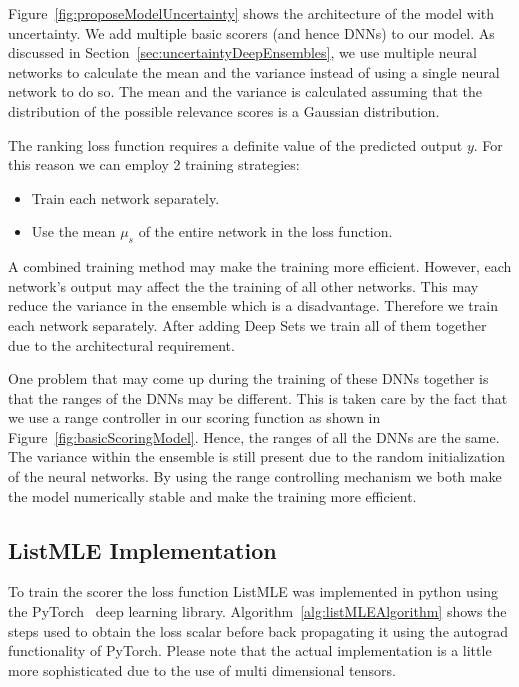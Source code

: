 \documentclass[12pt, twoside, ngerman]{report}
\begin{document}
Figure~\ref{fig:proposeModelUncertainty} shows the architecture of the model with uncertainty.
We add multiple basic scorers (and hence DNNs) to our model.
As discussed in Section~\ref{sec:uncertaintyDeepEnsembles},  we use multiple neural networks to calculate the mean and the variance instead of using a single neural network to do so.
The mean and the variance is calculated assuming that the distribution of the possible relevance scores is a Gaussian distribution.

The ranking loss function requires a definite value of the predicted output $y$.
For this reason we can employ 2 training strategies:
\begin{itemize}
\item Train each network separately.
\item Use the mean $\mu_s$ of the entire network in the loss function.
\end{itemize}
A combined training method may make the training more efficient.
However,  each network's output may affect the the training of all other networks. 
This may reduce the variance in the ensemble which is a disadvantage.
Therefore we train each network separately.
After adding Deep Sets we train all of them together due to the architectural requirement.

One problem that may come up during the training of these DNNs together is that the ranges of the DNNs may be different.
This is taken care by the fact that we use a range controller in our scoring function as shown in Figure~\ref{fig:basicScoringModel}.
Hence, the ranges of all the DNNs are the same. 
The variance within the ensemble is still present due to the random initialization of the neural networks.
By using the range controlling mechanism we both make the model numerically stable and make the training more efficient.

\subsection{ListMLE Implementation}

To train the scorer the loss function ListMLE was implemented in python using the PyTorch~\cite{PyTorch} deep learning library.
Algorithm~\ref{alg:listMLEAlgorithm} shows the steps used to obtain the loss scalar before back propagating it using the autograd functionality of PyTorch.
Please note that the actual implementation is a little more sophisticated due to the use of multi dimensional tensors.
\end{document}
